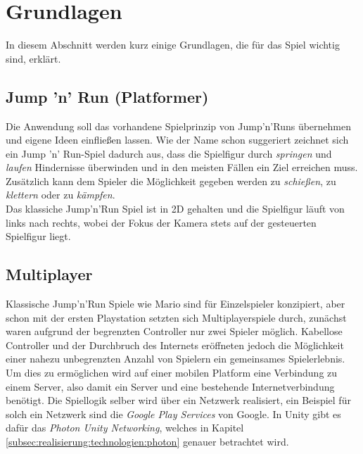 \chapter{Grundlagen}
\label{cha:grundlagen}
In diesem Abschnitt werden kurz einige Grundlagen, die für das Spiel wichtig sind, erklärt. 

\section{Jump 'n' Run (Platformer)}
\label{sec:grundlagen:jumpnrun}
Die Anwendung soll das vorhandene Spielprinzip von Jump'n'Runs übernehmen und eigene Ideen einfließen lassen. Wie der Name schon suggeriert zeichnet sich ein Jump 'n' Run-Spiel dadurch aus, dass die Spielfigur durch \textit{springen} und \textit{laufen} Hindernisse überwinden und in den meisten Fällen ein Ziel erreichen muss. Zusätzlich kann dem Spieler die Möglichkeit gegeben werden zu \textit{schießen}, zu \textit{klettern} oder zu \textit{kämpfen}. \\
Das klassiche Jump'n'Run Spiel ist in 2D gehalten und die Spielfigur läuft von links nach rechts, wobei der Fokus der Kamera stets auf der gesteuerten Spielfigur liegt. 


\section{Multiplayer}
\label{sec:grundlagen:multiplayer}
Klassische Jump'n'Run Spiele wie Mario sind für Einzelspieler konzipiert, aber schon mit der ersten Playstation \cite{playstation} setzten sich Multiplayerspiele durch, zunächst waren aufgrund der begrenzten Controller nur zwei Spieler möglich. Kabellose Controller und der Durchbruch des Internets eröffneten jedoch die Möglichkeit einer nahezu unbegrenzten Anzahl von Spielern ein gemeinsames Spielerlebnis. \\
Um dies zu ermöglichen wird auf einer mobilen Platform eine Verbindung zu einem Server, also damit ein Server und eine bestehende Internetverbindung benötigt. Die Spiellogik selber wird über ein Netzwerk realisiert, ein Beispiel für solch ein Netzwerk sind die \textit{Google Play Services} \cite{googleplayservices} von Google. In Unity gibt es dafür das \textit{Photon Unity Networking}, welches in Kapitel \ref{subsec:realisierung:technologien:photon} genauer betrachtet wird.


